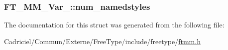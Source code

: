 \hypertarget{struct_f_t___m_m___var___ac54bdd53447f4967b5d3b1a341a4bdff}{
\subsubsection[{num\-\_\-namedstyles}]{ F\-T\-\_\-\-M\-M\-\_\-\-Var\-\_\-\-::num\-\_\-namedstyles}}\label{struct_f_t___m_m___var___ac54bdd53447f4967b5d3b1a341a4bdff}


The documentation for this struct was generated from the following file\-:\begin{DoxyCompactItemize}
\item 
Cadriciel/\-Commun/\-Externe/\-Free\-Type/include/freetype/\hyperlink{ftmm_8h}{ftmm.\-h}\end{DoxyCompactItemize}
